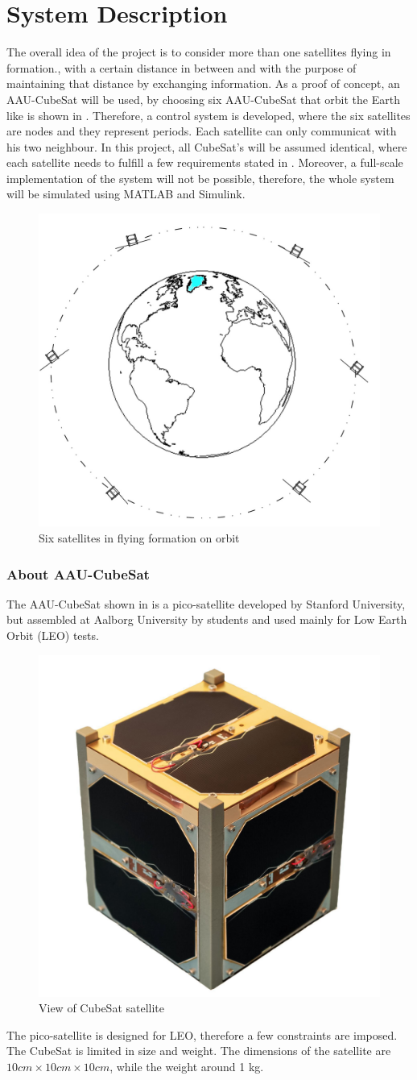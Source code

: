 \chapter{System Description}\label{chap:systemDescribtion}
The overall idea of the project is to consider more than one satellites flying in formation., with a certain distance in between and with the purpose of maintaining that distance by exchanging information. As a proof of concept, an AAU-CubeSat will be used, by choosing six AAU-CubeSat that orbit the Earth like is shown in  . Therefore, a control system is developed, where the six satellites are nodes and they represent periods. Each satellite can only communicat with his two neighbour. In this project, all CubeSat's will be assumed identical, where each satellite needs to fulfill a few requirements stated in . Moreover, a full-scale implementation of the system will not be possible, therefore, the whole system will be simulated using MATLAB and Simulink. 
%
\begin{figure}[H]
	\centering
	\includegraphics[width=0.6\linewidth]{figures/earth}
	\caption{Six satellites in flying formation on orbit}
	\label{fig:1}
\end{figure}
%
\subsection{About AAU-CubeSat}
The AAU-CubeSat shown in  is a pico-satellite developed by Stanford University, but assembled at Aalborg University by students and used mainly for Low Earth Orbit (LEO)  tests.
\begin{figure}[H]
	\centering
	\includegraphics[width=0.3\linewidth]{figures/aau_cubsat}
	\caption{View of CubeSat satellite}
	\label{fig:pico}
\end{figure}
The pico-satellite is designed for LEO, therefore a few constraints are imposed. The CubeSat is limited in size and weight. The dimensions of the satellite are $10cm\times10cm\times10cm$, while the weight around 1 kg. 

